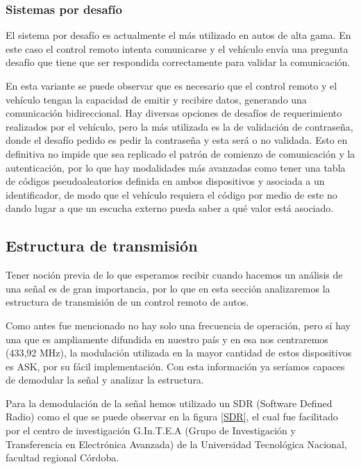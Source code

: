 \documentclass[12pt]{report}
\begin{document}
\subsubsection{Sistemas por desafío}

El sistema por desafío es actualmente el más utilizado en autos de alta gama. En este caso el control remoto intenta comunicarse y
el vehículo envía una pregunta desafío que tiene que ser respondida correctamente para validar la comunicación.\par
En esta variante se puede observar que es necesario que el control remoto y el vehículo tengan la capacidad de
emitir y recibire datos, generando una comunicación bidireccional.
Hay diversas opciones de desafíos de requerimiento realizados por el vehículo, pero la más utilizada es la de validación de contraseña, donde el desafío pedido
es pedir la contraseña y esta será o no validada. Esto en definitiva no impide que sea replicado el patrón de comienzo de comunicación y 
la autenticación, por lo que hay modalidades más avanzadas como tener una tabla de códigos pseudoaleatorios definida en ambos dispositivos
y asociada a un identificador, de modo que el vehículo requiera el código por medio de este no dando lugar a que un escucha externo pueda saber
a qué valor está asociado.

\subsection{Estructura de transmisión}

Tener noción previa de lo que esperamos recibir cuando hacemos un análisis de una señal es de gran importancia, por lo que en esta sección 
analizaremos la estructura de transmisión de un control remoto de autos.\par
Como antes fue mencionado no hay solo una frecuencia de operación, pero sí hay una que es ampliamente difundida en nuestro país y en esa nos 
centraremos (433,92 MHz), la modulación utilizada en la mayor cantidad de estos dispositivos es ASK, por su fácil implementación. Con esta
información ya seríamos capaces de demodular la señal y analizar la estructura.\par 
Para la demodulación de la señal hemos utilizado un SDR (Software Defined Radio) como el que se puede observar en la figura \ref{SDR}, el cual
fue facilitado por el centro de investigación G.In.T.E.A (Grupo de Investigación y Transferencia en Electrónica Avanzada) de la Universidad
Tecnológica Nacional, facultad regional Córdoba.\par
\end{document}
